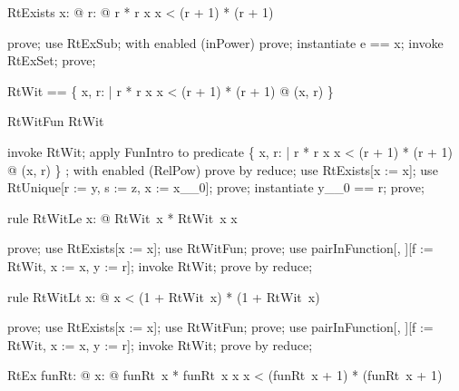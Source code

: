 \documentclass{article}
\begin{document}
\begin{theorem}{RtExists}
  \forall x: \nat @ \exists r: \nat @ r * r \leq x \land x < (r + 1) * (r + 1)
\end{theorem}

\begin{zproof}
prove;
use RtExSub;
with enabled (inPower) prove;
instantiate e == x;
invoke RtExSet;
prove;
\end{zproof}

\begin{zed}
  RtWit == \{ x, r: \nat | r * r \leq x \land x < (r + 1) * (r + 1) @ (x, r) \}
\end{zed}

\begin{theorem}{RtWitFun}
  RtWit \in \nat \fun \nat
\end{theorem}

\begin{zproof}
invoke RtWit;
apply FunIntro to predicate \{ x, r: \nat | r * r \leq x \land x < (r + 1) * (r + 1) @ (x, r) \}
  \in \nat \fun \nat;
with enabled (RelPow) prove by reduce;
use RtExists[x := x];
use RtUnique[r := y, s := z, x := x\_\_0];
prove;
instantiate y\_\_0 == r;
prove;
\end{zproof}

\begin{theorem}{rule RtWitLe}
  \forall x: \nat @ RtWit~x * RtWit~x \leq x
\end{theorem}

\begin{zproof}
prove;
use RtExists[x := x];
use RtWitFun;
prove;
use pairInFunction[\nat, \nat][f := RtWit, x := x, y := r];
invoke RtWit;
prove by reduce;
\end{zproof}

\begin{theorem}{rule RtWitLt}
  \forall x: \nat @ x < (1 + RtWit~x) * (1 + RtWit~x)
\end{theorem}

\begin{zproof}
prove;
use RtExists[x := x];
use RtWitFun;
prove;
use pairInFunction[\nat, \nat][f := RtWit, x := x, y := r];
invoke RtWit;
prove by reduce;
\end{zproof}

\begin{theorem}{RtEx}
  \exists funRt: \nat \fun \nat @
    \forall x: \nat @ funRt~x * funRt~x \leq x \land x < (funRt~x + 1) * (funRt~x + 1)
\end{theorem}
\end{document}
